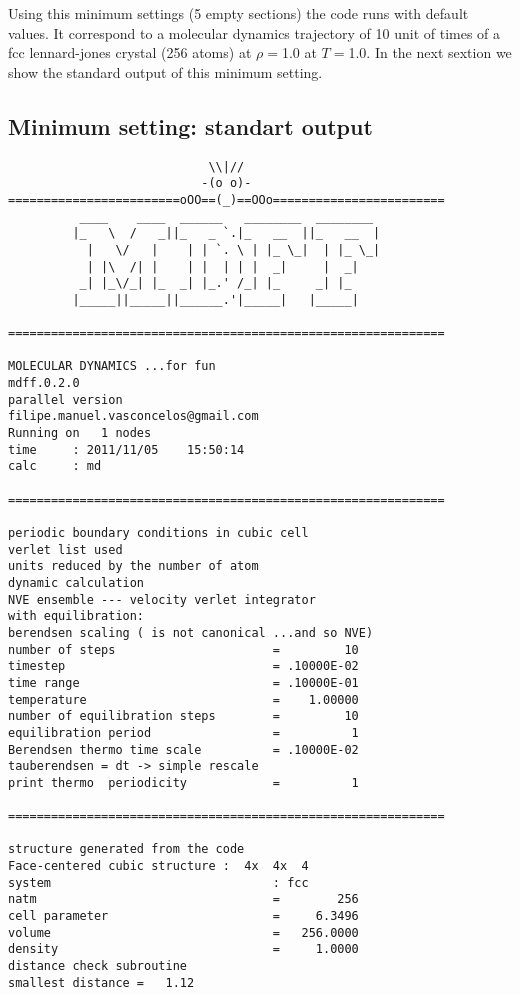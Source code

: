 \documentclass[10pt,a4paper]{article}
\begin{document}
Using this minimum settings (5 empty sections) the code runs with default values.
It correspond to a molecular dynamics trajectory of 10 unit of times of a fcc lennard-jones 
crystal (256 atoms) at $\rho=$1.0 at $T=$1.0. In the next sextion we show the standard output of this minimum setting. 

\clearpage
\subsection{Minimum setting: standart output}
\begin{verbatim}
                            \\|//                    
                           -(o o)-                           
========================oOO==(_)==OOo========================
          ____    ____  ______   ________  ________  
         |_   \  /   _||_   _ `.|_   __  ||_   __  | 
           |   \/   |    | | `. \ | |_ \_|  | |_ \_| 
           | |\  /| |    | |  | | |  _|     |  _|    
          _| |_\/_| |_  _| |_.' /_| |_     _| |_     
         |_____||_____||______.'|_____|   |_____|    
  
=============================================================

MOLECULAR DYNAMICS ...for fun                 
mdff.0.2.0
parallel version
filipe.manuel.vasconcelos@gmail.com  
Running on   1 nodes                  
time     : 2011/11/05    15:50:14
calc     : md                                                          

=============================================================

periodic boundary conditions in cubic cell     
verlet list used 
units reduced by the number of atom
dynamic calculation
NVE ensemble --- velocity verlet integrator    
with equilibration:             
berendsen scaling ( is not canonical ...and so NVE)
number of steps                      =         10
timestep                             = .10000E-02
time range                           = .10000E-01
temperature                          =    1.00000
number of equilibration steps        =         10
equilibration period                 =          1
Berendsen thermo time scale          = .10000E-02
tauberendsen = dt -> simple rescale
print thermo  periodicity            =          1

=============================================================

structure generated from the code
Face-centered cubic structure :  4x  4x  4  
system                               : fcc                                                         
natm                                 =        256
cell parameter                       =     6.3496
volume                               =   256.0000
density                              =     1.0000
distance check subroutine
smallest distance =   1.12


\end{verbatim}
\end{document}
